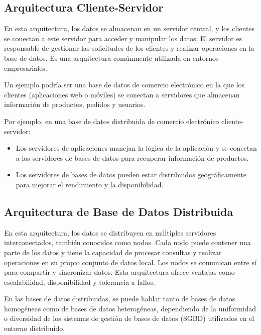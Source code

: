 \subsection{Arquitectura Cliente-Servidor}
\noindent
En esta arquitectura, los datos se almacenan en un servidor central, y los clientes se conectan a este servidor para acceder y manipular los datos. El servidor es responsable de gestionar las solicitudes de los clientes y realizar operaciones en la base de datos. Es una arquitectura comúnmente utilizada en entornos empresariales.

Un ejemplo podría ser una base de datos de comercio electrónico en la que los clientes (aplicaciones web o móviles) se conectan a servidores que almacenan información de productos, pedidos y usuarios.

Por ejemplo, en una base de datos distribuida de comercio electrónico cliente-servidor:
\begin{itemize}
	\item Los servidores de aplicaciones manejan la lógica de la aplicación y se conectan a los servidores de bases de datos para recuperar información de productos.
	\item Los servidores de bases de datos pueden estar distribuidos geográficamente para mejorar el rendimiento y la disponibilidad.
\end{itemize}

\subsection{Arquitectura de Base de Datos Distribuida}
\noindent
En esta arquitectura, los datos se distribuyen en múltiples servidores interconectados, también conocidos como nodos. Cada nodo puede contener una parte de los datos y tiene la capacidad de procesar consultas y realizar operaciones en su propio conjunto de datos local. Los nodos se comunican entre sí para compartir y sincronizar datos. Esta arquitectura ofrece ventajas como escalabilidad, disponibilidad y tolerancia a fallos.

En las bases de datos distribuidas, se puede hablar tanto de bases de datos homogéneas como de bases de datos heterogéneas, dependiendo de la uniformidad o diversidad de los sistemas de gestión de bases de datos (SGBD) utilizados en el entorno distribuido.

